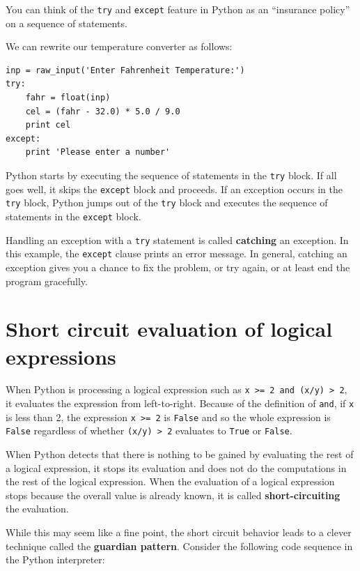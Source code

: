 \documentclass[10pt]{book}
\begin{document}
You can think of the {\tt try} and {\tt except} feature
in Python as an ``insurance policy'' on a sequence of
statements.

We can rewrite our temperature converter as follows:

\beforeverb
\begin{verbatim}
inp = raw_input('Enter Fahrenheit Temperature:')
try:
    fahr = float(inp)
    cel = (fahr - 32.0) * 5.0 / 9.0
    print cel
except:
    print 'Please enter a number'
\end{verbatim}
\afterverb
%

Python starts by executing the 
sequence of statements in the 
{\tt try} block.  If all goes
well, it skips the {\tt except} block and proceeds.  If an
exception occurs in the {\tt try} block, 
Python jumps out of the {\tt try} block and
executes the sequence of statements in the {\tt except} block.

Handling an exception with a {\tt try} statement is called {\bf
catching} an exception.  In this example, the {\tt except} clause
prints an error message.  In general,
catching an exception gives you a chance to fix the problem, or try
again, or at least end the program gracefully.

\section{Short circuit evaluation of logical expressions}

When Python is processing a logical expression such as 
{\tt x >= 2 and (x/y) > 2}, it evaluates the expression
from left-to-right.  Because of the definition of {\tt and},
if {\tt x} is less than 2, the expression {\tt x >= 2} is 
{\tt False} and so the whole expression is {\tt False} regardless
of whether {\tt (x/y) > 2} evaluates to {\tt True} or {\tt False}.

When Python detects that there is nothing to be gained by evaluating
the rest of a logical expression, it stops its evaluation and does
not do the computations in the rest of the logical expression.  
When the evaluation of a logical expression stops because the overall
value is already known, it is called {\bf short-circuiting} 
the evaluation.

While this may seem like a fine point, the short circuit behavior
leads to a clever technique called the {\bf guardian pattern}.  
Consider the following code sequence in the Python interpreter:
\end{document}
